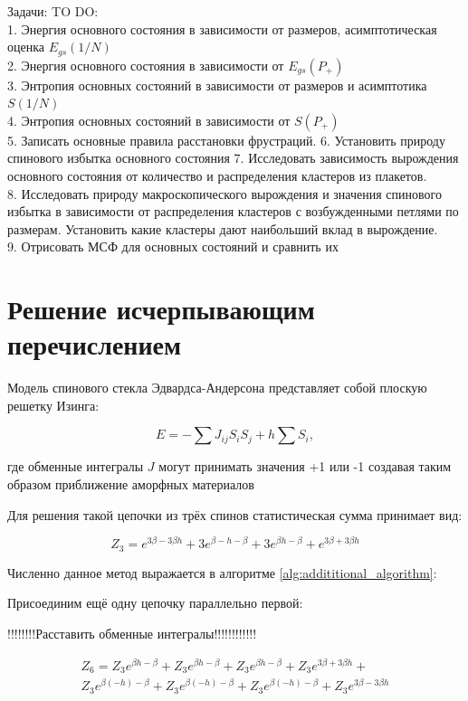 \documentclass[utf8, babel, sor, jor, amsmath, amssymb, reprint]{elsarticle} %
\begin{document}
Задачи:
TO DO: \\
1. Энергия основного состояния в зависимости от размеров, асимптотическая оценка $E_{gs}(1/N)$ \\
2. Энергия основного состояния в зависимости от $E_{gs}(P_+)$ \\
3. Энтропия основных состояний в зависимости от размеров и асимптотика $S(1/N)$ \\
4. Энтропия основных состояний в зависимости от  $S(P_+)$  \\
5. Записать основные правила расстановки фрустраций.
6. Установить природу спинового избытка основного состояния
7. Исследовать зависимость вырождения основного состояния от количество и распределения кластеров из плакетов.\\
8. Исследовать природу макроскопического вырождения и значения спинового избытка в зависимости от распределения кластеров с возбужденными петлями по размерам. Установить какие кластеры дают наибольший вклад в вырождение.\\
9. Отрисовать МСФ для основных состояний и сравнить их

\section{Решение исчерпывающим перечислением}

Модель спинового стекла Эдвардса-Андерсона представляет собой плоскую решетку Изинга:

\begin{equation}
	E = -\sum J_{ij} S_i S_j + h \sum S_i,
	\label{eq:ising_energy}
\end{equation}

 где обменные интегралы $J$ могут принимать значения +1 или -1 создавая таким образом приближение аморфных материалов

Для решения такой цепочки из трёх спинов статистическая сумма принимает вид:

\begin{equation}
	Z_3 = e^{3\beta - 3\beta h} + 3e^{\beta - h - \beta} + 3e^{\beta h - \beta} + e^{3\beta + 3\beta h}
	\label{eq:stat_3}
\end{equation}


Численно данное метод выражается в алгоритме \ref{alg:addititional_algorithm}:

Присоединим ещё одну цепочку параллельно первой:

!!!!!!!!Расставить обменные интегралы!!!!!!!!!!!!

\begin{equation}
	\label{eq:stat_3_un}
	\begin{alignedat}{2}
	Z_6 = Z_3 e^{\beta  h-\beta }+Z_3 e^{\beta  h-\beta }+Z_3 e^{\beta  h-\beta }+Z_3 e^{3 \beta +3 \beta  h}+ \\
	Z_3 e^{\beta  (-h)-\beta }+Z_3 e^{\beta  (-h)-\beta }+Z_3 e^{\beta  (-h)-\beta }+Z_3 e^{3 \beta -3 \beta  h}
	\end{alignedat}
\end{equation}
\end{document}
